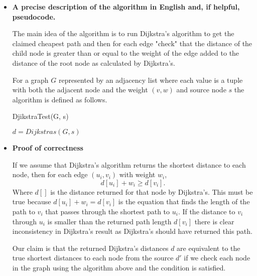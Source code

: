 \documentclass[letterpaper,11pt]{article}
\begin{document}
\begin{itemize}
    \color{teal}
    \item \textbf{A precise description of the algorithm in English and, if helpful, 
        pseudocode.}

        The main idea of the algorithm is to run Dijkstra's algorithm to 
        get the claimed cheapest path and then for each edge "check" that 
        the distance of the child node is greater than or equal to the weight
        of the edge added to the distance of the root node as calculated by 
        Dijkstra's.

        For a graph $G$ represented by an adjacency list where each value is a 
        tuple with both the adjacent node and the weight $(v, w)$ and source 
        node $s$ the algorithm is defined as follows. 

        \begin{algorithm}[H]
            \color{teal}
            \caption{DjikstraTest(G, s)} 
            $d = Dijkstras(G, s)$ \;
        \end{algorithm}

    \item \textbf{Proof of correctness}
        
        If we assume that Dijkstra's algorithm returns the shortest distance 
        to each node, then for each edge $(u_i, v_i)$ with weight $w_i$, 
        \[
            d[u_i] + w_i \ge d[v_i]
        .\] 
        Where $d[]$ is the distance returned for that node by Dijkstra's. This 
        must be true because $d[u_i] + w_i = d[v_i]$ is the equation that finds
        the length of the path to $v_i$ that passes through the shortest path
        to $u_i$. If the distance to $v_i$ through $u_i$ is smaller than the 
        returned path length $d[v_i]$ there is clear inconsistency in Dijkstra's 
        result as Dijkstra's should have returned this path. 
        
        Our claim is that the returned Dijkstra's distances $d$ are equivalent 
        to the true shortest distances to each node from the source $d'$ if we 
        check each node in the graph using the algorithm above and the 
        condition is satisfied.


\end{itemize}
\end{document}
